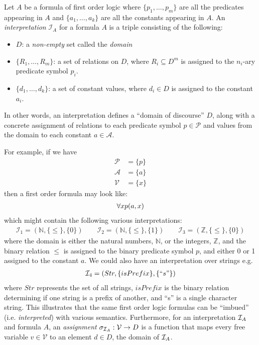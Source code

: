 \documentclass[10pt]{article}
\begin{document}
Let $A$ be a formula of first order logic where $\{p_1,\dots,p_m\}$ are all the predicates appearing in $A$ and $\{a_1,\dots,a_k\}$ are all the constants appearing in $A$. An \textit{interpretation} $\mathcal{I}_A$ for a formula $A$ is a triple consisting of the following: 
\begin{itemize}
    \item $D$: a \textit{non-empty} set called the \textit{domain}
    \item $\{R_1,\dots, R_m\}$: a set of relations on $D$, where $R_i \subseteq D^{m}$ is assigned to the $n_i$-ary predicate symbol $p_i$.
    \item $\{d_1,\dots,d_k\}$: a set of constant values, where $d_i \in D$ is assigned to the constant $a_i$.
\end{itemize}
In other words, an interpretation defines a ``domain of discourse'' $D$, along with a concrete assignment of relations to each predicate symbol $p \in \mathcal{P}$ and values from the domain to each constant $a \in \mathcal{A}$. 

For example, if we have
\begin{align*}
    \mathcal{P} &= \{p\}\\
    \mathcal{A} &= \{a\}\\
    \mathcal{V} &= \{x\}
\end{align*}
then a first order formula may look like:
\begin{align*}
    \forall x p(a,x)
\end{align*}
which might contain the following various interpretations:
\begin{align*}
    \mathcal{I}_1 = (\mathbb{N},\{\leq\},\{0\})\qquad 
    \mathcal{I}_2 = (\mathbb{N},\{\leq\},\{1\})\qquad
    \mathcal{I}_3 = (\mathbb{Z},\{\leq\},\{0\})
\end{align*}
where the domain is either the natural numbers, $\mathbb{N}$, or the integers, $\mathbb{Z}$, and the binary relation $\leq$ is assigned to the binary predicate symbol $p$, and either 0 or 1 assigned to the constant $a$. We could also have an interpretation over strings e.g.
\begin{align*}
    \mathcal{I}_4 = (Str, \{isPrefix\}, \{``s"\})
\end{align*}
where $Str$ represents the set of all strings, $isPrefix$ is the binary relation determining if one string is a prefix of another, and ``s'' is a single character string. This illustrates that the same first order logic formulas can be ``imbued'' (i.e. \textit{interpreted}) with various semantics. Furthermore, for an interpretation $\mathcal{I}_A$ and formula $A$, an \textit{assignment} $\sigma_{\mathcal{I}_A} : \mathcal{V} \rightarrow D$ is a function that maps every free variable $v \in \mathcal{V}$ to an element $d \in D$, the domain of $\mathcal{I}_A$.
\end{document}
